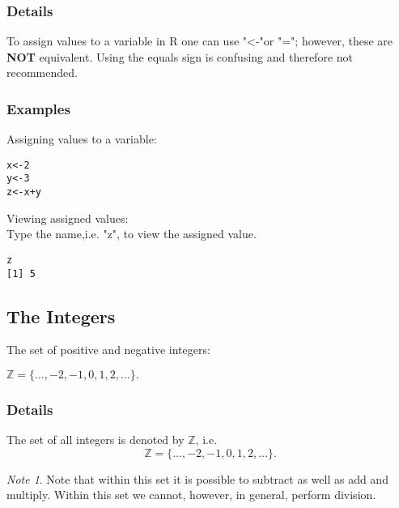 \documentclass[12pt,a4paper]{article}
\theoremstyle{regla}
\theoremstyle{remark}
\newtheorem{notes}{Note}[section]
\theoremstyle{definition}
\theoremstyle{nonumberbreak}
\begin{document}
\subsubsection{Details}
To assign values to a variable in R one can use "$\texttt{<-}$"\text{ }or "$\texttt{=}$"; however, these are {\bf NOT} equivalent. Using the equals sign is confusing and therefore not recommended.
\subsubsection{Examples}
\begin{xmpl} 
Assigning values to a variable:
\begin{lstlisting} 
x<-2
y<-3
z<-x+y 
\end{lstlisting} 
\end{xmpl} 

\begin{xmpl} 

Viewing assigned values:\\
Type the name,i.e. "z", to view the assigned value. 

\begin{lstlisting} 
z
[1] 5
\end{lstlisting}

\end{xmpl} 



\subsection{The Integers}
\begin{fbox}
\begin{minipage}{0.97\textwidth}
The set of positive and negative integers:

$\mathbb{Z} = \{\dots, -2, -1, 0, 1, 2, \dots \}.$

\end{minipage}
\end{fbox}
\subsubsection{Details}
\begin{defn}
The set of all integers is denoted by $\mathbb{Z}$, i.e.
$$\mathbb{Z} = \{\dots, -2, -1, 0, 1, 2, \dots \}.$$
\end{defn}

\begin{notes}
Note that within this set it is possible to subtract as well as add and multiply. Within this set we cannot, however, in general, perform division.
\end{notes}
\end{document}

